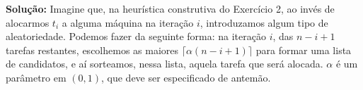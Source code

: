 \noindent \textbf{Solução:}
Imagine que, na heurística construtiva do Exercício 2, ao invés de alocarmos $t_i$ a alguma máquina na iteração $i$, introduzamos algum tipo de aleatoriedade. Podemos fazer da seguinte forma: na iteração $i$, das $n-i+1$ tarefas restantes, escolhemos as maiores $\lceil \alpha (n-i+1) \rceil$ para formar uma lista de candidatos, e aí sorteamos, nessa lista, aquela tarefa que será alocada.
$\alpha$ é um parâmetro em $(0, 1)$, que deve ser especificado de antemão.
